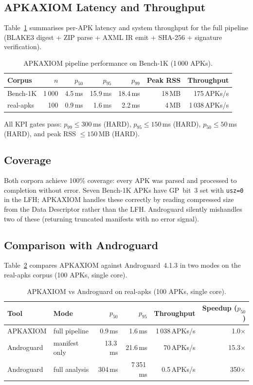 \documentclass[runningheads]{llncs}
\begin{document}
\subsection{APKAXIOM Latency and Throughput}

Table~\ref{tab:apkaxiom} summarises per-APK latency and system throughput for
the full pipeline (BLAKE3 digest + ZIP parse + AXML IR emit + SHA-256 +
signature verification).

\begin{table}[t]
\centering
\caption{APKAXIOM pipeline performance on Bench-1K (1\,000 APKs).}
\label{tab:apkaxiom}
\begin{tabular}{lrrrrrr}
\toprule
Corpus & $n$ & $p_{50}$ & $p_{95}$ & $p_{99}$ & Peak RSS & Throughput \\
\midrule
Bench-1K   & 1\,000 & 4.5\,ms & 15.9\,ms & 18.4\,ms & 18\,MB & 175\,APKs/s \\
real-apks  &    100 & 0.9\,ms &  1.6\,ms &  2.2\,ms &  4\,MB & 1\,038\,APKs/s \\
\bottomrule
\end{tabular}
\end{table}

All KPI gates pass: $p_{99} \leq 300$\,ms (HARD), $p_{95} \leq 150$\,ms
(HARD), $p_{50} \leq 50$\,ms (HARD), and peak RSS $\leq 150$\,MB (HARD).

\subsection{Coverage}

Both corpora achieve 100\% coverage: every APK was parsed and processed to
completion without error.  Seven Bench-1K APKs have GP~bit~3 set with
\texttt{usz=0} in the LFH; APKAXIOM handles these correctly by reading
compressed size from the Data Descriptor rather than the LFH.  Androguard
silently mishandles two of these (returning truncated manifests with no error
signal).

\subsection{Comparison with Androguard}

Table~\ref{tab:comparison} compares APKAXIOM against Androguard~4.1.3 in two
modes on the real-apks corpus (100 APKs, single core).

\begin{table}[t]
\centering
\caption{APKAXIOM vs Androguard on real-apks (100 APKs, single core).}
\label{tab:comparison}
\begin{tabular}{llrrrr}
\toprule
Tool & Mode & $p_{50}$ & $p_{95}$ & Throughput & Speedup ($p_{50}$) \\
\midrule
APKAXIOM       & full pipeline  &  0.9\,ms &  1.6\,ms & 1\,038\,APKs/s & 1.0$\times$ \\
Androguard     & manifest only  & 13.3\,ms & 21.6\,ms &    70\,APKs/s  & 15.3$\times$ \\
Androguard     & full analysis  & 304\,ms  & 7\,351\,ms &  0.5\,APKs/s & 350$\times$ \\
\bottomrule
\end{tabular}
\end{table}
\end{document}
